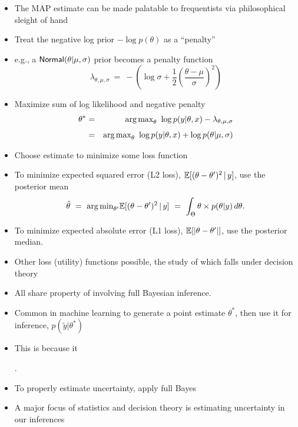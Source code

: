\documentclass[10pt]{report}
\begin{document}
\begin{itemize}
\item The MAP estimate can be made palatable to frequentists 
via philosophical sleight of hand 
\item Treat the negative log prior $-\log p(\theta)$ as a ``penalty''
\item e.g., a $\text{\sf Normal}(\theta|\mu,\sigma)$ prior becomes a penalty function 
\[
\lambda_{\theta, \mu,\sigma}
\  = \ 
-\left( 
   \log \sigma + \frac{1}{2}\left(\frac{\theta -  \mu}{\sigma}\right)^2 
 \right)
\]
\item Maximize sum of log likelihood and negative penalty
\begin{eqnarray*}
\theta^{*} 
& = & \mbox{arg\,max}_{\theta} \ \log p(y|\theta,x) - \lambda_{\theta,\mu,\sigma}
\\[4pt]
& = & \mbox{arg\,max}_{\theta} \ \log p(y|\theta,x) + \log p(\theta|\mu,\sigma)
\end{eqnarray*}
\end{itemize}

\begin{itemize}
\item Choose estimate to minimize some loss function
\item To minimize expected squared error (L2 loss), 
$\mathbb{E}[(\theta - \theta')^2 \, | \, y]$, use the posterior mean
\[
\hat{\theta}
\ = \ \mbox{arg\,min}_{\theta'} \mathbb{E}[(\theta - \theta')^2 \, | \, y]
\ = \ \int_{\Theta} \theta \times p(\theta|y) \, d\theta.
\]
\item To minimize expected absolute error (L1 loss), $\mathbb{E}[|\theta -
    \theta'|]$, use the posterior median.
\item Other loss (utility) functions possible, the study of which falls under
  decision theory
\item All share property of involving full Bayesian inference.
\end{itemize}


\begin{itemize}
\item Common in machine learning to generate a point estimate
  $\theta^*$, then use it for inference, $p(\tilde{y} | \theta^{*})$
\item This is \myemph{defective} because it
\begin{center}
{\large{}.}
\end{center}
\item To properly estimate uncertainty, apply full Bayes
\item A major focus of statistics and decision theory is estimating
  uncertainty in our inferences
\end{itemize}
\end{document}
